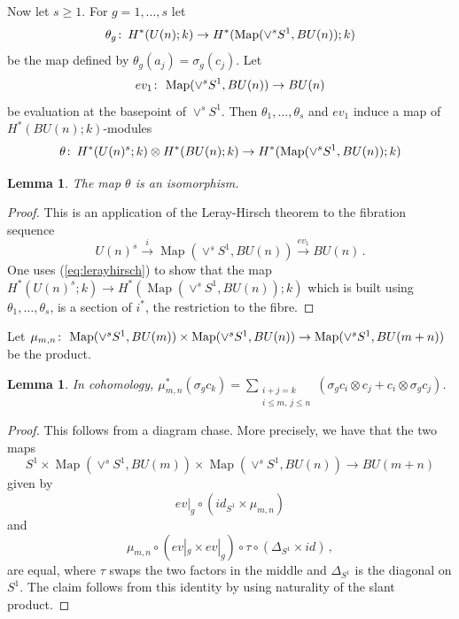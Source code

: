 \documentclass[oneside, a4paper, 12pt]{article}
\numberwithin{equation}{section}
\newcommand{\Map}{\operatorname{Map}}
\newcommand{\co}{\colon\thinspace}
\theoremstyle{plain}
\newtheorem{lemma}[theorem]{Lemma}
\theoremstyle{definition}
\theoremstyle{remark}
\begin{document}
Now let $s\geq 1$. For $g=1,\dots,s$ let
\[
\theta_g\co H^\ast(U(n);k)\to H^\ast(\Map(\vee^s S^1, BU(n));k)
\]
be the map defined by $\theta_g(a_j)=\sigma_g (c_j)$. Let
\[
ev_1\co \Map(\vee^s S^1,BU(n))\to BU(n)
\]
be evaluation at the basepoint of $\vee^s S^1$. Then $\theta_1,\dots,\theta_s$ and $ev_1$ induce a map of $H^\ast(BU(n);k)$-modules
\[
\theta\co H^\ast(U(n)^s;k)\otimes H^\ast(BU(n);k) \to H^\ast(\Map(\vee^s S^1,BU(n));k)
\]

\begin{lemma} \label{lem:LBUn}
The map $\theta$ is an isomorphism.
\end{lemma}
\begin{proof}
This is an application of the Leray-Hirsch theorem to the fibration sequence
\[
U(n)^s \xrightarrow{i} \Map(\vee^s S^1,BU(n)) \xrightarrow{ev_1} BU(n)\, .
\]
One uses (\ref{eq:lerayhirsch}) to show that the map $H^\ast(U(n)^s;k) \to H^\ast(\Map(\vee^s S^1,BU(n));k)$ which is built using $\theta_1,\dots,\theta_s$, is a section of $i^\ast$, the restriction to the fibre.
\end{proof}


Let $\mu_{m,n}\co \Map(\vee^s S^1,BU(m))\times \Map(\vee^s S^1,BU(n))\to \Map(\vee^s S^1,BU(m+n))$ be the product.

\begin{lemma} \label{lem:comultiplication}
In cohomology, $\mu_{m,n}^\ast(\sigma_g c_k)=\sum_{\substack{i+j=k\\ i\leq m,\, j\leq n}} (\sigma_g c_i\otimes c_j+c_i\otimes \sigma_g c_j)$.
\end{lemma}
\begin{proof}
This follows from a diagram chase. More precisely, we have that the two maps
\[
S^1\times \Map(\vee^s S^1,BU(m))\times \Map(\vee^s S^1,BU(n))\to BU(m+n)
\]
given by
\[
ev|_g\circ (id_{S^1}\times \mu_{m,n})
\]
and
\[
\mu_{m,n}\circ (ev|_g\times ev|_g)\circ \tau\circ (\Delta_{S^1}\times id)\,,
\]
are equal, where $\tau$ swaps the two factors in the middle and $\Delta_{S^1}$ is the diagonal on $S^1$. The claim follows from this identity by using naturality of the slant product.
\end{proof}
\end{document}
